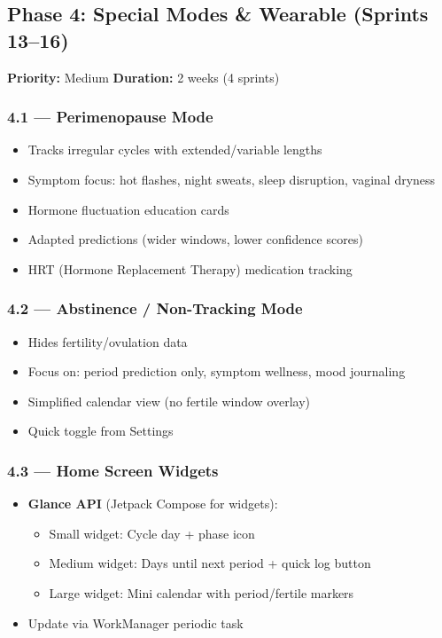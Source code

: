 \documentclass[12pt,a4paper]{article}
\begin{document}
\subsection{\textcolor{phase4}{Phase 4: Special Modes \& Wearable (Sprints 13--16)}}

\begin{tcolorbox}[colback=phase4!5, colframe=phase4, title=\textbf{Goal: Lifecycle coverage and platform expansion}]
\textbf{Priority:} Medium \hfill \textbf{Duration:} 2 weeks (4 sprints)
\end{tcolorbox}

\subsubsection{4.1 — Perimenopause Mode}
\begin{itemize}[leftmargin=1.5em]
  \item Tracks irregular cycles with extended/variable lengths
  \item Symptom focus: hot flashes, night sweats, sleep disruption, vaginal dryness
  \item Hormone fluctuation education cards
  \item Adapted predictions (wider windows, lower confidence scores)
  \item HRT (Hormone Replacement Therapy) medication tracking
\end{itemize}

\subsubsection{4.2 — Abstinence / Non-Tracking Mode}
\begin{itemize}[leftmargin=1.5em]
  \item Hides fertility/ovulation data
  \item Focus on: period prediction only, symptom wellness, mood journaling
  \item Simplified calendar view (no fertile window overlay)
  \item Quick toggle from Settings
\end{itemize}

\subsubsection{4.3 — Home Screen Widgets}
\begin{itemize}[leftmargin=1.5em]
  \item \textbf{Glance API} (Jetpack Compose for widgets):
  \begin{itemize}
    \item Small widget: Cycle day + phase icon
    \item Medium widget: Days until next period + quick log button
    \item Large widget: Mini calendar with period/fertile markers
  \end{itemize}
  \item Update via WorkManager periodic task
\end{itemize}
\end{document}

